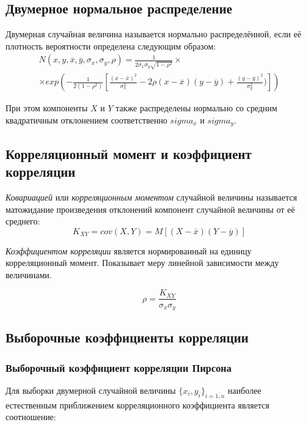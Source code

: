 \subsection{Двумерное нормальное распределение}

Двумерная случайная величина называется нормально распределённой, если её плотность вероятности определена следующим образом:
\begin{multline}
	N(x, y, \overline{x}, \overline{y}, \sigma_x, \sigma_y, \rho) =
	\frac{1}{2 \sigma_x \sigma_y \sqrt{1 - \rho^2}} \times \\	
	\times exp \left( - \frac{1}{2(1 - \rho^2)} \left[ \frac{(x - \overline{x})^2}{\sigma_x^2} - 2 \rho (x - \overline{x}) (y - \overline{y}) + \frac{(y - \overline{y})^2}{\sigma_y^2}) \right] \right) 
\end{multline}

При этом компоненты $X$ и $Y$ также распределены нормально со средним квадратичным отклонением соответственно $sigma_x$ и $sigma_y$.

\subsection{Корреляционный момент и коэффициент корреляции}

\textit{Ковариацией} или \textit{корреляционным моментом} случайной величины называется матожидание произведения отклонений компонент случайной величины от её среднего:
\begin{equation}
	K_{XY} = cov(X, Y) = M[(X - \overline{x})(Y - \overline{y})]
\end{equation}

\textit{Коэффициентом корреляции} является нормированный на единицу корреляционный момент. Показывает меру линейной зависимости между величинами.

\begin{equation}\label{eq:correlation}
	\rho = \frac{K_{XY}}{\sigma_x \sigma_y}
\end{equation}

\subsection{Выборочные коэффициенты корреляции}
\subsubsection{Выборочный коэффициент корреляции Пирсона}

Для выборки двумерной случайной величины $\{x_i, y_i\}_{i=\overline{1,n}}$ наиболее естественным приближением корреляционного коэффициента является соотношение:

